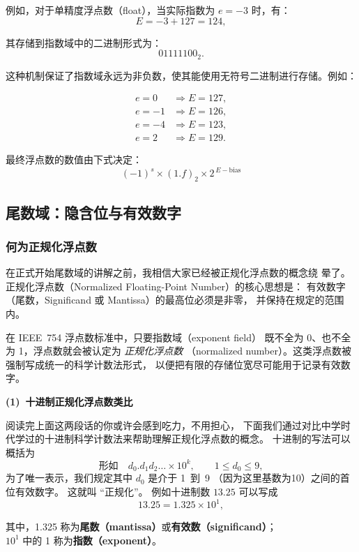 例如，对于单精度浮点数（float），当实际指数为 $e=-3$ 时，有：
\[
E = -3 + 127 = 124,
\]

其存储到指数域中的二进制形式为：
\[
01111100_2.
\]



这种机制保证了指数域永远为非负数，使其能使用无符号二进制进行存储。例如：

\[
\begin{aligned}
e = 0  &\Rightarrow E = 127,\\
e = -1 &\Rightarrow E = 126,\\
e = -4 &\Rightarrow E = 123,\\
e = 2  &\Rightarrow E = 129.
\end{aligned}
\]

最终浮点数的数值由下式决定：
\[
(-1)^s \times (1.f)_2 \times 2^{\,E - \mathrm{bias}}
\]




\subsection{尾数域：隐含位与有效数字}
\subsubsection{何为正规化浮点数}
在正式开始尾数域的讲解之前，我相信大家已经被正规化浮点数的概念绕
晕了。
正规化浮点数（Normalized Floating-Point Number）的核心思想是：
有效数字（尾数，Significand 或 Mantissa）的最高位必须是非零，
并保持在规定的范围内。

在 IEEE~754 浮点数标准中，只要指数域（exponent field）
既不全为 0、也不全为 1，浮点数就会被认定为 \emph{正规化浮点数}
（normalized number）。这类浮点数被强制写成统一的科学计数法形式，
以便把有限的存储位宽尽可能用于记录有效数字。

\vspace{1em}
\noindent\textbf{(1)~十进制正规化浮点数类比}\par\vspace{0.5em}

阅读完上面这两段话的你或许会感到吃力，不用担心，
下面我们通过对比中学时代学过的十进制科学计数法来帮助理解正规化浮点数的概念。
十进制的写法可以概括为
\[
\text{形如}\quad d_0.d_1d_2\ldots \times 10^k,\qquad 1 \le d_0 \le 9,
\]
为了唯一表示，我们规定其中 $d_0$ 是介于 1~到~9 （因为这里基数为10）之间的首位有效数字。
这就叫 “正规化”。
例如十进制数 $13.25$ 可以写成
\[
13.25 = 1.325 \times 10^{1},
\]

\begin{footnotesize}
\noindent
其中，1.325 称为\textbf{尾数（mantissa）}或\textbf{有效数（significand）}；\\
$10^{1}$ 中的 1 称为\textbf{指数（exponent）}。
\end{footnotesize}
\vspace{1em}



